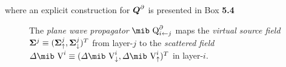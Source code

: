 where an explicit construction for ${\mbox{\boldmath$\mit Q$\unboldmath}}^{\partial}$ is presented in {\sc Box} {\bf 5.4}
\begin{figure}
\HideDisplacementBoxes
\centerline{}
\caption{
The {\em plane wave propagator\/} 
$ {\mbox{\mib Q}}^{\partial}_{i \leftarrow j}$ 
maps the {\em virtual source field\/} ${\bf \Sigma}^{ j}\equiv (
{\bf \Sigma}_{\uparrow}^{ j}, {\bf \Sigma}_{\downarrow}^{ j})^T$ from layer-$j$ to the 
{\em scattered field\/} ${\mit \Delta}\mbox{\mib V}^{ i}\equiv (
{\mit \Delta}\mbox{\mib V}_{\downarrow}^{ i}, {\mit \Delta}\mbox{\mib V}_{\uparrow}^{ i})^T$  in layer-$i$.
}
\protect\label{Qfig}
\end{figure}
 
